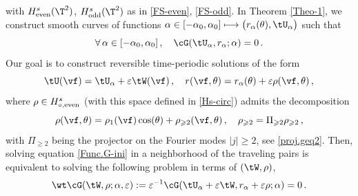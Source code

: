 \documentclass[a4paper,reqno,10pt]{article}
\begin{document}
 with $ H_{\rm even}^s(\T^2)$, $ H_{\rm odd}^s(\T^2)$ as in \eqref{FS-even}, \eqref{FS-odd}.
   In Theorem \ref{Theo-1}, we  construct smooth curves of functions $\alpha\in[-\alpha_0,\alpha_0]\longmapsto \big(r_\alpha(\theta), \tU_\alpha\big)$ such that
   $$
   \forall \, \alpha\in[-\alpha_0,\alpha_0]\,,\quad\cG(\tU_\alpha,r_\alpha;\alpha)=0\,.
   $$
   Our goal is to construct {reversible} time-periodic solutions of the form
\begin{equation}\label{perturbed.solution0}
	\tU(\vf) = \tU_{\alpha} + \varepsilon \tW(\vf) \,, \quad r(\vf,\theta) = r_\alpha(\theta) + \varepsilon \rho(\vf,\theta)\,,
\end{equation}
where $\rho\in H^{s}_{\circ,\textnormal{even}}$ (with this space  defined in \eqref{Hs-circ}) admits the decomposition 
\begin{equation}
	\rho(\vf,\theta) =\rho_{1}(\vf) \cos(\theta) + \rho_{\geqslant 2}(\vf,\theta) \,, \quad \rho_{\geqslant 2}= \Pi_{\geqslant 2} \rho_{\geqslant 2}\,,
\end{equation}
with  $\Pi_{\geqslant 2}$ being the projector on the Fourier modes $|j|\geq 2$, see \eqref{proj.geq2}.
Then, solving equation \eqref{Func.G-ini} in a neighborhood of the traveling pairs is equivalent to solving the following problem in terms of $(\tW, \rho)$,
\begin{equation}\label{full.nonlin.eq.pert0}
	\wt\cG (\tW,\rho;\alpha,\varepsilon) := \varepsilon^{-1} \cG(\tU_{\alpha}+ \varepsilon \tW, r_\alpha+ \varepsilon \rho;\alpha)=0\,.
\end{equation}
\end{document}
